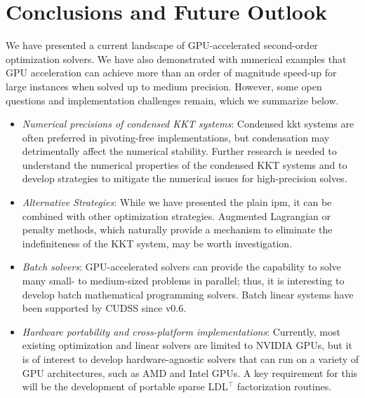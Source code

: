 \documentclass{article}
\begin{document}


\section{Conclusions and Future Outlook}\label{eqn:conclusion}
We have presented a current landscape of GPU-accelerated second-order optimization solvers. We have also demonstrated with numerical examples that GPU acceleration can achieve more than an order of magnitude speed-up for large instances when solved up to medium precision. However, some open questions and implementation challenges remain, which we summarize below.

\begin{itemize}[leftmargin=*,itemsep=0pt,parsep=0pt,partopsep=0pt]
\item \textit{Numerical precisions of condensed KKT systems}: Condensed \gls*{kkt} systems are often preferred in pivoting-free implementations, but condensation may detrimentally affect the numerical stability. Further research is needed to understand the numerical properties of the condensed KKT systems and to develop strategies to mitigate the numerical issues for high-precision solves.
\item \textit{Alternative Strategies}: While we have presented the plain \gls*{ipm}, it can be combined with other optimization strategies. Augmented Lagrangian or penalty methods, which naturally provide a mechanism to eliminate the indefiniteness of the KKT system, may be worth investigation.
\item \textit{Batch solvers}: GPU-accelerated solvers can provide the capability to solve many small- to medium-sized problems in parallel; thus, it is interesting to develop batch mathematical programming solvers. Batch linear systems have been supported by CUDSS since v0.6.
\item \textit{Hardware portability and cross-platform implementations}: Currently, most existing optimization and linear solvers are limited to NVIDIA GPUs, but it is of interest to develop hardware-agnostic solvers that can run on a variety of GPU architectures, such as AMD and Intel GPUs. A key requirement for this will be the development of portable sparse LDL$^\top$ factorization routines.
\end{itemize}
\end{document}

